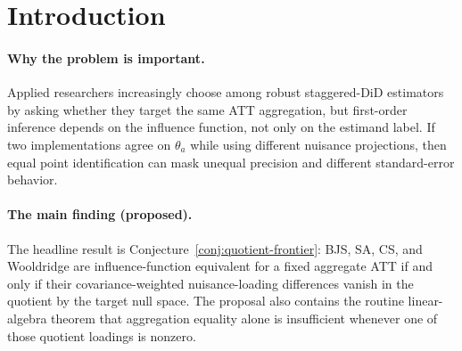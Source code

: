 \documentclass[11pt]{article}
\theoremstyle{definition}
\theoremstyle{plain}
\theoremstyle{remark}
\begin{document}
\begin{abstract}
Modern staggered DiD papers give several estimators that can be written as targeting the same
aggregate ATT, but equality of the written estimand does not settle equality of their first-order
influence functions.  This proposal asks for a sharp finite-dimensional frontier separating
aggregation-equivalence from influence-function-equivalence for BJS imputation, Sun--Abraham
interaction-weighting, Callaway--Sant'Anna group-time aggregation, and Wooldridge saturated TWFE.
The kernel conjecture is that the boundary is a quotient row-space condition: after removing the
null directions of the target aggregation \(a\), the estimator-specific nuisance projection operators
must agree on the BJS efficient influence function, i.e. the canonical gradient.  The diagnostic is
not design-only: the operator
\(\Gamma_m(\pi,\Sigma,a)\) is built from observable design and covariance objects, while the boundary
condition also uses the identified population ATT vector \(\tau\).  Off this quotient-zero set, two
estimators can report the same \(\theta_a\) while having strictly different canonical influence
functions and asymptotic variances.  Resolving the conjecture would turn the current estimator-choice
discussion in staggered DiD into a computable plug-in diagnostic for when point-identification-equivalent
procedures are also efficiency-equivalent.
\end{abstract}

\section{Introduction}
\paragraph{Why the problem is important.}
Applied researchers increasingly choose among robust staggered-DiD estimators by asking whether they
target the same ATT aggregation, but first-order inference depends on the influence function, not only
on the estimand label.  If two implementations agree on \(\theta_a\) while using different nuisance
projections, then equal point identification can mask unequal precision and different standard-error
behavior.

\paragraph{The main finding (proposed).}
The headline result is Conjecture~\ref{conj:quotient-frontier}: BJS, SA, CS, and Wooldridge are
influence-function equivalent for a fixed aggregate ATT if and only if their covariance-weighted
nuisance-loading differences vanish in the quotient by the target null space.  The proposal also
contains the routine linear-algebra theorem that aggregation equality alone is insufficient whenever
one of those quotient loadings is nonzero.
\end{document}
